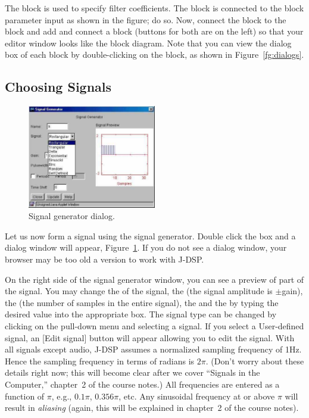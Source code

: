 The  block is used to specify filter coefficients. The
block is connected to the  block parameter input as
shown in the figure; do so. Now, connect the  block to
the  block and add and connect a  block
(buttons for both are on the left) so that your editor window looks
like the block diagram. Note that you can view the dialog box of each
block by double-clicking on the block, as shown in
Figure~\ref{fg:dialogs}.

\subsection{Choosing Signals}

\begin{figure}
\begin{center}
\includegraphics[width=0.5\textwidth]{lab1/image020}
\end{center}
\caption{Signal generator dialog.\label{fg:sig-gen}}
\end{figure}

Let us now form a signal using the signal generator. Double click
the  box and a dialog window will
appear, Figure~\ref{fg:sig-gen}. If you do not see a dialog window,
your browser may be too old a version to work with J-DSP.

On the right side of the signal generator window, you can see a
preview of part of the signal. You may change the  of the
signal, the  (the signal amplitude is $\pm$gain), the
 (the number of samples in the entire signal), the
 and the  by typing the desired
value into the appropriate box. The signal type can be changed by
clicking on the pull-down menu and selecting a signal. If you select a
User-defined signal, an [Edit signal] button will appear allowing you
to edit the signal. With all signals except audio, J-DSP assumes a
normalized sampling frequency of 1Hz. Hence the sampling frequency in
terms of radians is $2\pi$. (Don't worry about these details right
now; this will become clear after we cover ``Signals in the
Computer,'' chapter~2 of the course notes.) All frequencies are
entered as a function of $\pi$, e.g., $0.1\pi$, $0.356\pi$, etc. Any
sinusoidal frequency at or above $\pi$ will result in \emph{aliasing}
(again, this will be explained in chapter~2 of the course notes).

